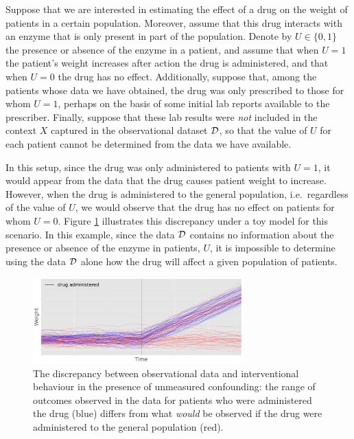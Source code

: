 \begin{importantresultwithtitle}[title=Toy example: Unmeasured confounding in medical decision-making]\noindent
Suppose that we are interested in estimating the effect of a drug on the weight of patients in a certain population. 
Moreover, assume that this drug interacts with an enzyme that is only present in part of the population.
Denote by $U \in \{0, 1\}$ the presence or absence of the enzyme in a patient, and assume that when $U = 1$ the patient's weight increases after action the drug is administered, and that when $U = 0$ the drug has no effect.
Additionally, suppose that, among the patients whose data we have obtained, the drug was only prescribed to those for whom $U = 1$, perhaps on the basis of some initial lab reports available to the prescriber.
Finally, suppose that these lab results were \emph{not} included in the context $X$ captured in the observational dataset $\mathcal{D}$, so that the value of $U$ for each patient cannot be determined from the data we have available. 

In this setup, since the drug was only administered to patients with $U=1$, it would appear from the data that the drug causes patient weight to increase. 
However, when the drug is administered to the general population, i.e.\ regardless of the value of $U$, we would observe that the drug has no effect on patients for whom $U=0$. Figure \ref{fig:syn_ex_intro} illustrates this discrepancy under a toy model for
this scenario. In this example, since the data $\mathcal{D}$ contains no information about the presence or absence of the enzyme in patients, $U$, it is impossible to determine using the data $\mathcal{D}$ alone how the drug will affect a given population of patients. 

    
\end{importantresultwithtitle}

\begin{figure}[t]
    \centering
    \includegraphics[height=3.3cm]{figures/causal/synthetic_example_newest2.pdf}
    \caption{The discrepancy between observational data and interventional behaviour in the presence of unmeasured confounding: the range of outcomes observed in the data for patients who were administered the drug (blue) differs from what \emph{would} be observed if the drug were administered to the general population (red).}
    \label{fig:syn_ex_intro}
\end{figure}

